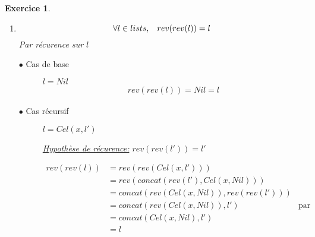 \documentclass{article}
\theoremstyle{plain}
\newtheorem{exo}{Exercice}%
\begin{document}
\begin{exo}
\begin{enumerate}
\begin{description}
        \underline{Hypothèse de récurence:} $rev(concat(l'_1,l_2)) = concat(rev(l_2),rev(l'_1))$
                
        \begin{align*}
            rev(concat(l_1,l_2)) 
                &= rev(concat(Cel(x, l'_1),l_2)) \\
                &= rev(Cel(x,concat(l'_1,l_2))) \\
                &= concat(rev(concat(l'_1, l_2)), Cel(x, Nil)) \\
                &= concat(concat(rev(l_2), rev(l'_1), Cel(x, Nil))) &\textrm{par HP} \\
                &= concat(rev(l_2), concat(rev(l'_1)), Cel(x, Nil)) \\
                &= concat(rev(l_2), rev(Cel(x, l'_1))) \\
                &= concat(rev(l_2), rev(l_1))
        \end{align*}
    \end{description}
\newpage
\item 
    \begin{equation*}
        \forall l \in lists,\hspace{3mm} 
        rev(rev(l)) = l 
    \end{equation*}
    Par récurence sur $l$
    \begin{description}
    \item[$\bullet$ Cas de base] $l = Nil$
        \begin{align*} 
            rev(rev(l)) = Nil = l
        \end{align*}
    \item[$\bullet$ Cas récursif] $l = Cel(x, l')$ 
                
        \underline{Hypothèse de récurence:} $rev(rev(l')) = l'$
        
        \begin{align*}
            rev(rev(l)) &= rev(rev(Cel(x, l'))) \\
                        &= rev(concat(rev(l'), Cel(x, Nil))) \\
                        &= concat(rev(Cel(x, Nil)), rev(rev(l'))) \\
                        &= concat(rev(Cel(x, Nil)), l') & \textrm{par HP}\\
                        &= concat(Cel(x, Nil), l') \\
                        &= l
        \end{align*}
    \end{description}
\end{enumerate}
\end{exo}
\end{document}
